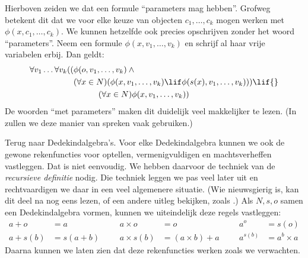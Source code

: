 \documentclass[../../../include/open-logic-section]{subfiles}
\begin{document}
Hierboven zeiden we dat een formule ``parameters mag hebben''. Grofweg
betekent dit dat we voor elke keuze van objecten $c_1, \ldots, c_k$
mogen werken met $\phi(x, c_1, \ldots, c_k)$. We kunnen hetzelfde ook
precies opschrijven zonder het woord ``parameters''. Neem een formule
$\phi(x, v_1, \ldots, v_k)$ en schrijf al haar vrije variabelen erbij.
Dan geldt:
	\begin{align*}
			\forall v_1 \ldots \forall v_k((&\phi(o, v_1,\ldots, v_k) \land {}\\
			&	(\forall x \in N)(\phi(x,v_1, \ldots, v_k) \lif \phi(s(x), v_1,\ldots, v_k))) \lif {}\\
			&\hspace{3em} (\forall x \in N)\phi(x, v_1,\ldots, v_k))
	\end{align*}
De woorden ``met parameters'' maken dit duidelijk veel makkelijker te
lezen. (In  zullen we deze manier van spreken vaak
gebruiken.)

Terug naar Dedekindalgebra's. Voor elke Dedekindalgebra kunnen we ook
de gewone rekenfuncties voor optellen, vermenigvuldigen en
machtsverheffen vastleggen. Dat is niet eenvoudig. We hebben daarvoor
de techniek van de \emph{recursieve definitie} nodig. Die techniek
leggen we pas veel later uit en rechtvaardigen we daar in een veel
algemenere situatie. (Wie nieuwsgierig is, kan dit deel na
 nog eens lezen, of een andere uitleg
bekijken, zoals \citealt[pp.~95--8]{Potter2004}.) Als $N, s, o$ samen
een Dedekindalgebra vormen, kunnen we uiteindelijk deze regels
vastleggen:
\begin{align*}
	{a} + {o} &= {a} & & & {a} \times {o} &= {o} & & & {a}^{o} &= s(o)\\
{a} + {s}({b}) &= {s}({a}+{b}) &&& {a} \times {s}({b}) &= ({a}\times {b}) + {a}  & & & {a}^{{s}({b})} &= {a}^{b} \times {a}
\end{align*}
Daarna kunnen we laten zien dat deze rekenfuncties werken zoals we
verwachten.
\end{document}
